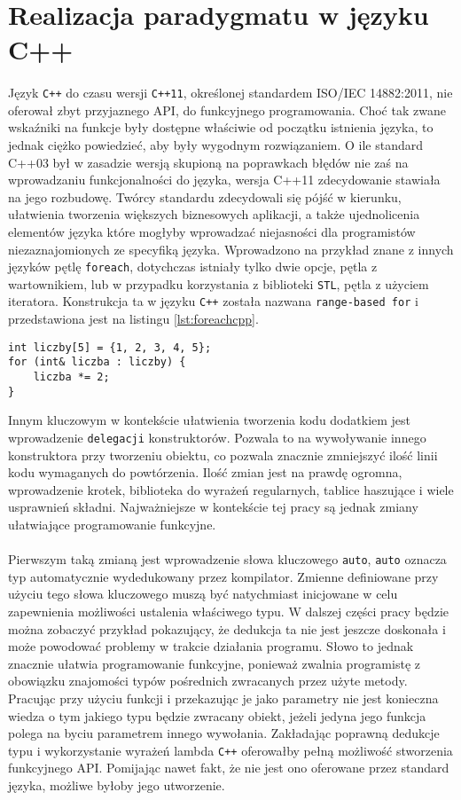 \documentclass[a4paper,10pt]{report}
\begin{document}
\section{Realizacja paradygmatu w języku C++}
\paragraph{}
Język \verb|C++| do czasu wersji \verb|C++11|, określonej standardem ISO/IEC 14882:2011, nie oferował zbyt przyjaznego API, do funkcyjnego programowania. Choć tak zwane wskaźniki na funkcje były dostępne właściwie od początku istnienia języka, to jednak ciężko powiedzieć, aby były wygodnym rozwiązaniem. O ile standard C++03 był w zasadzie wersją skupioną na poprawkach błędów nie zaś na wprowadzaniu funkcjonalności do języka, wersja C++11 zdecydowanie stawiała na jego rozbudowę. Twórcy standardu zdecydowali się pójść w kierunku, ułatwienia tworzenia większych biznesowych aplikacji, a także ujednolicenia elementów języka które mogłyby wprowadzać niejasności dla programistów niezaznajomionych ze specyfiką języka. Wprowadzono na przykład znane z innych języków pętlę \verb|foreach|, dotychczas istniały tylko dwie opcje, pętla z wartownikiem, lub w przypadku korzystania z biblioteki \verb|STL|, pętla z użyciem iteratora. Konstrukcja ta w języku \verb|C++| została nazwana \verb|range-based for| i przedstawiona jest na listingu \ref{lst:foreachcpp}.
\begin{lstlisting}[caption={Pętla foreach w C++},label={lst:foreachcpp}]
int liczby[5] = {1, 2, 3, 4, 5};
for (int& liczba : liczby) {
	liczba *= 2;
}
\end{lstlisting}
Innym kluczowym w kontekście ułatwienia tworzenia kodu dodatkiem jest wprowadzenie \verb|delegacji| konstruktorów. Pozwala to na wywoływanie innego konstruktora przy tworzeniu obiektu, co pozwala znacznie zmniejszyć ilość linii kodu wymaganych do powtórzenia. Ilość zmian jest na prawdę ogromna, wprowadzenie krotek, biblioteka do wyrażeń regularnych, tablice haszujące i wiele usprawnień składni. Najważniejsze w kontekście tej pracy są jednak zmiany ułatwiające programowanie funkcyjne.
\paragraph{}
 Pierwszym taką zmianą jest wprowadzenie słowa kluczowego \verb|auto|, \verb|auto| oznacza typ automatycznie wydedukowany przez kompilator. Zmienne definiowane przy użyciu tego słowa kluczowego muszą być natychmiast inicjowane w celu zapewnienia możliwości ustalenia właściwego typu. W dalszej części pracy będzie można zobaczyć przykład pokazujący, że dedukcja ta nie jest jeszcze doskonała i może powodować problemy w trakcie działania programu. Słowo to jednak znacznie ułatwia programowanie funkcyjne, ponieważ zwalnia programistę z obowiązku znajomości typów pośrednich zwracanych przez użyte metody. Pracując przy użyciu funkcji i przekazując je jako parametry nie jest konieczna wiedza o tym jakiego typu będzie zwracany obiekt, jeżeli jedyna jego funkcja polega na byciu parametrem innego wywołania. Zakładając poprawną dedukcje typu i wykorzystanie wyrażeń lambda \verb|C++| oferowałby pełną możliwość stworzenia funkcyjnego API. Pomijając nawet fakt, że nie jest ono oferowane przez standard języka, możliwe byłoby jego utworzenie.
\end{document}
